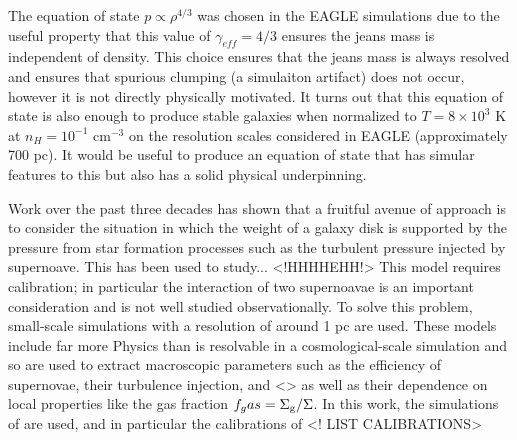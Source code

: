 The equation of state $p \propto \rho^{4/3}$ was chosen in the EAGLE simulations \citep{schaye2015} due to the useful property that this value of $\gamma_{eff} = 4/3$ ensures the jeans mass is independent of density.
This choice ensures that the jeans mass is always resolved and ensures that spurious clumping (a simulaiton artifact) does not occur, however it is not directly physically motivated.
It turns out that this equation of state is also enough to produce stable galaxies when normalized to $T = 8\times 10^3$ K at $n_H = 10^{-1}$ cm$^{-3}$ on the resolution scales considered in EAGLE (approximately 700 pc).
It would be useful to produce an equation of state that has simular features to this but also has a solid physical underpinning.

Work over the past three decades has shown that a fruitful avenue of approach is to consider the situation in which the weight of a galaxy disk is supported by the pressure from star formation processes such as the turbulent pressure injected by supernoave. 
This has been used to study... <!HHHHEHH!>
This model requires calibration; in particular the interaction of two supernoavae is an important consideration and is not well studied observationally.
To solve this problem, small-scale simulations with a resolution of around 1 pc \citep{martizzi2015} are used.
These models include far more Physics than is resolvable in a cosmological-scale simulation and so are used to extract macroscopic parameters such as the efficiency of supernovae, their turbulence injection, and <> as well as their dependence on local properties like the gas fraction $f_gas = \Sigma_\mathrm{g}/\Sigma$.
In this work, the simulations of \citet{martizzi2015} are used, and in particular the calibrations of
<! LIST CALIBRATIONS>
